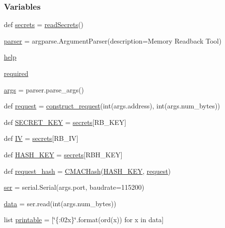 \subsubsection*{Variables}
\begin{DoxyCompactItemize}
\item 
def \hyperlink{namespacereadback_a7ef58b6350bb8f1ea4b81d24cac72a55}{secrets} = \hyperlink{namespacereadback_a7e694d4aa4ee2fc3c68862d4c30379e5}{read\+Secrets}()
\item 
\hyperlink{namespacereadback_a90eee7a4677ca8b1ed116364a24367f9}{parser} = argparse.\+Argument\+Parser(description=\textquotesingle{}Memory Readback Tool\textquotesingle{})
\item 
\hyperlink{namespacereadback_a81ae9faedaa69e3e28e2960a0548df8d}{help}
\item 
\hyperlink{namespacereadback_ae81948490ddf54e80a22593640178350}{required}
\item 
\hyperlink{namespacereadback_a8187411843a6284ffb964ef3fb9fcab3}{args} = parser.\+parse\+\_\+args()
\item 
def \hyperlink{namespacereadback_a7ea72716d3813b3d175a880ff91eca73}{request} = \hyperlink{namespacereadback_ac98f954f8259c56156baf91af488f6cf}{construct\+\_\+request}(int(args.\+address), int(args.\+num\+\_\+bytes))
\item 
def \hyperlink{namespacereadback_a02f2277a7bdf9af309a578b94b663182}{S\+E\+C\+R\+E\+T\+\_\+\+K\+EY} = \hyperlink{namespacereadback_a7ef58b6350bb8f1ea4b81d24cac72a55}{secrets}\mbox{[}\textquotesingle{}R\+B\+\_\+\+K\+EY\textquotesingle{}\mbox{]}
\item 
def \hyperlink{namespacereadback_ae386c01157ae5fa56c90d5430fda2f06}{IV} = \hyperlink{namespacereadback_a7ef58b6350bb8f1ea4b81d24cac72a55}{secrets}\mbox{[}\textquotesingle{}R\+B\+\_\+\+IV\textquotesingle{}\mbox{]}
\item 
def \hyperlink{namespacereadback_a35a9a34ee7518a921d8160de0d047582}{H\+A\+S\+H\+\_\+\+K\+EY} = \hyperlink{namespacereadback_a7ef58b6350bb8f1ea4b81d24cac72a55}{secrets}\mbox{[}\textquotesingle{}R\+B\+H\+\_\+\+K\+EY\textquotesingle{}\mbox{]}
\item 
def \hyperlink{namespacereadback_ab9bf3a2a626c2e1065571afbbfd14afb}{request\+\_\+hash} = \hyperlink{namespacereadback_a4060e3a940d166a7303d3327c2d6d2c7}{C\+M\+A\+C\+Hash}(\hyperlink{namespacereadback_a35a9a34ee7518a921d8160de0d047582}{H\+A\+S\+H\+\_\+\+K\+EY}, \hyperlink{namespacereadback_a7ea72716d3813b3d175a880ff91eca73}{request})
\item 
\hyperlink{namespacereadback_a5b7028344d79661ed4abe535b0e7e307}{ser} = serial.\+Serial(args.\+port, baudrate=115200)
\item 
\hyperlink{namespacereadback_a8d6c5236d106a59c389eaa162449dfdd}{data} = ser.\+read(int(args.\+num\+\_\+bytes))
\item 
list \hyperlink{namespacereadback_a27236d5c0ccd38009c3ff7e940446593}{printable} = \mbox{[}\char`\"{}\{\+:02x\}\char`\"{}.\+format(ord(x)) for x in data\mbox{]}
\end{DoxyCompactItemize}


